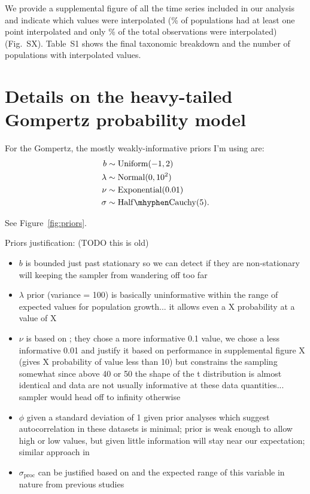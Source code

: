 \documentclass[12pt]{article}
\begin{document}
We provide a supplemental figure of all the time series included in our analysis and indicate which values were interpolated (\percImputedPops\% of populations had at least one point interpolated and only \percImputedPoints\% of the total observations were interpolated) (Fig.\ SX). Table~S1 shows the final taxonomic breakdown and the number of populations with interpolated values.

\section{Details on the heavy-tailed Gompertz probability model}

For the Gompertz, the mostly weakly-informative priors I'm using are:
\begin{align*}
b &\sim \mathrm{Uniform}(-1, 2)\\
\lambda &\sim \mathrm{Normal}(0, 10^2)\\
\nu &\sim \mathrm{Exponential}(0.01)\\
\sigma &\sim \mathrm{Half\mhyphen Cauchy} (5).
\end{align*}

See Figure~\ref{fig:priors}.

Priors justification: (TODO this is old)

\begin{itemize}
\item $b$ is bounded just past stationary so we can detect if they are non-stationary will keeping the sampler from wandering off too far

\item $\lambda$ prior (variance = 100) is basically uninformative within the range of expected values for population growth... it allows even a X probability at a value of X

\item $\nu$ is based on \citet{fernandez1998}; they chose a more informative 0.1 value, we chose a less informative 0.01 and justify it based on performance in supplemental figure X (gives X probability of value less than 10) but constrains the sampling somewhat since above 40 or 50 the shape of the t distribution is almost identical and data are not usually informative at these data quantities... sampler would head off to infinity otherwise

\item $\phi$ given a standard deviation of 1 given prior analyses which suggest autocorrelation in these datasets is minimal; prior is weak enough to allow high or low values, but given little information will stay near our expectation; similar approach in \citep{thorson2014a}

\item $\sigma_\mathrm{proc}$ can be justified based on \citet{gelman2006c} and the expected range of this variable in nature from previous studies \citep[e.g.][]{connors2014}
\end{itemize}
\end{document}
